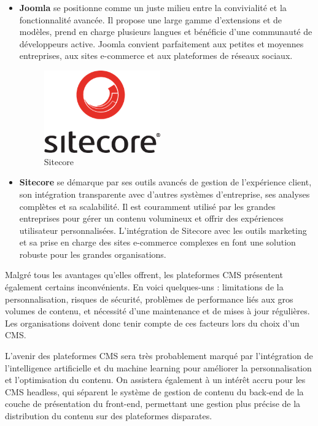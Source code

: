 \begin{itemize}
\item \textbf{Joomla} se positionne comme un juste milieu entre la convivialité et la fonctionnalité avancée. Il propose une large gamme d'extensions et de modèles, prend en charge plusieurs langues et bénéficie d'une communauté de développeurs active. Joomla convient parfaitement aux petites et moyennes entreprises, aux sites e-commerce et aux plateformes de réseaux sociaux.

\begin{figure}[H] 
    \centering
    \includegraphics[width=5cm]{Figures/Sitecore.png}
    \caption{Sitecore }
    \label{fig:my_label} %
\end{figure}


\item \textbf{Sitecore} se démarque par ses outils avancés de gestion de l'expérience client, son intégration transparente avec d'autres systèmes d'entreprise, ses analyses complètes et sa scalabilité. Il est couramment utilisé par les grandes entreprises pour gérer un contenu volumineux et offrir des expériences utilisateur personnalisées. L'intégration de Sitecore avec les outils marketing et sa prise en charge des sites e-commerce complexes en font une solution robuste pour les grandes organisations.

\end{itemize}
Malgré tous les avantages qu'elles offrent, les plateformes CMS présentent également certains inconvénients. En voici quelques-uns : limitations de la personnalisation, risques de sécurité, problèmes de performance liés aux gros volumes de contenu, et nécessité d'une maintenance et de mises à jour régulières. Les organisations doivent donc tenir compte de ces facteurs lors du choix d'un CMS.

L'avenir des plateformes CMS sera très probablement marqué par l'intégration de l'intelligence artificielle et du machine learning pour améliorer la personnalisation et l'optimisation du contenu. On assistera également à un intérêt accru pour les CMS headless, qui séparent le système de gestion de contenu du back-end de la couche de présentation du front-end, permettant une gestion plus précise de la distribution du contenu sur des plateformes disparates.

